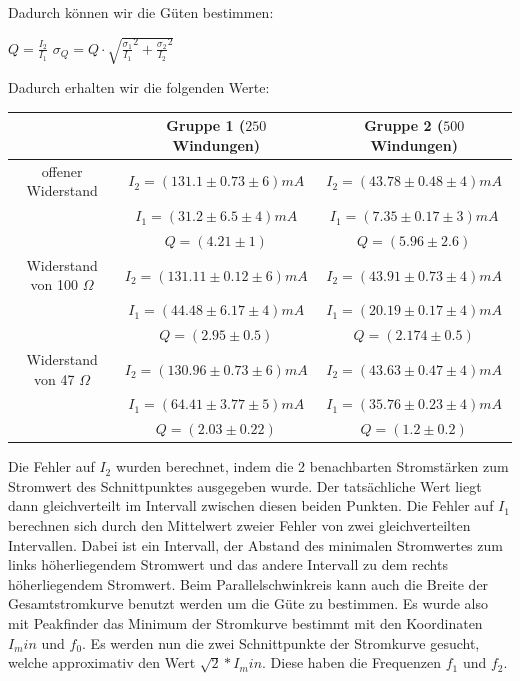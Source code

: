 \documentclass[a4paper, 11pt]{article}
\begin{document}
Dadurch können wir die Güten bestimmen:
\begin{center}
$ Q= \frac{I_2}{I_1}$
\; \; \:
$ \sigma_Q=Q \cdot \sqrt{\frac{\sigma_1}{I_1}^2+\frac{\sigma_2}{I_2}^2}
$
\end{center}
Dadurch erhalten wir die folgenden Werte:
\begin{center}


\begin{tabular}{|c|c|c|}
\hline 	$ $ 	&	Gruppe 1 ($250$ Windungen)	&	Gruppe 2 ($500$ Windungen) \\
\hline 	offener Widerstand 	&	$ I_2 = (131.1 \pm 0.73\pm6) mA$					&	$ I_2 = (43.78 \pm 0.48\pm4) mA$	\\
\hline 	$ $ 	&	$ I_1 = (31.2 \pm 6.5\pm4) mA$					&	$ I_1 = (7.35 \pm 0.17\pm3) mA$	\\
\hline 		&	$ Q = (4.21 \pm 1) $	&	$ Q = (5.96 \pm 2.6)  $ \\
\hline	Widerstand von 100 $\Omega$	&	$ I_2 = (131.11 \pm 0.12\pm6) mA$					&	$ I_2 = (43.91 \pm 0.73\pm4) mA$	\\
\hline 	$ $ 	&	$ I_1 = (44.48 \pm 6.17\pm4) mA$					&	$ I_1 = (20.19 \pm 0.17\pm4) mA$	\\
\hline 		&	$ Q = (2.95 \pm 0.5)$	&	$ Q = (2.174 \pm 0.5)  $ \\
\hline	Widerstand von 47 $\Omega$	&	$ I_2 = (130.96 \pm 0.73\pm6) mA$					&	$ I_2 = (43.63 \pm 0.47\pm4) mA$	\\
\hline 	$ $ 	&	$ I_1 = (64.41 \pm 3.77\pm5) mA$					&	$ I_1 = (35.76 \pm 0.23\pm4) mA$	\\
\hline 		&	$ Q = (2.03 \pm 0.22) $	&	$ Q = (1.2 \pm 0.2)  $ \\
\hline	

\end{tabular}
\end{center}

Die Fehler auf $I_2$ wurden berechnet, indem die 2 benachbarten Stromstärken zum Stromwert des Schnittpunktes ausgegeben wurde. Der tatsächliche Wert liegt dann gleichverteilt im Intervall zwischen diesen beiden Punkten.
Die Fehler auf $I_1$ berechnen sich durch den Mittelwert zweier Fehler von zwei gleichverteilten Intervallen. Dabei ist ein Intervall, der Abstand des minimalen Stromwertes zum links höherliegendem Stromwert und das andere Intervall zu dem rechts höherliegendem Stromwert.
\newline
\newline
Beim Parallelschwinkreis kann auch die Breite der Gesamtstromkurve benutzt werden um die Güte zu bestimmen.
Es wurde also mit Peakfinder das Minimum der Stromkurve bestimmt mit den Koordinaten $I_min$ und $f_0$. Es werden nun die zwei Schnittpunkte der Stromkurve gesucht, welche approximativ den Wert $\sqrt{2}*I_min$. Diese haben die Frequenzen $f_1$ und $f_2$.
\end{document}
